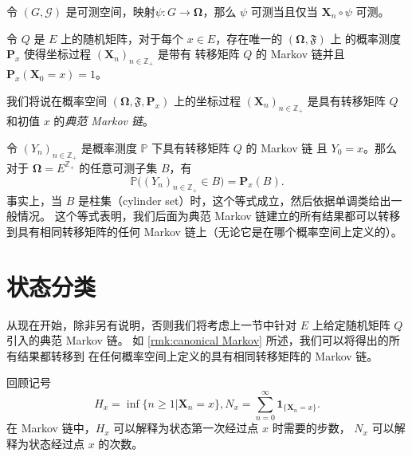\documentclass[fontset=none]{Notes}
\newcommand{\mat}[1]{\mathbold{#1}}
\newcommand{\matup}[1]{\mathbf{#1}}
\newcommand{\indicator}[1]{\mathbold 1_{#1}}
\begin{document}
\begin{lemma}
  令 $(G,\mathcal{G})$ 是可测空间，映射$\psi:G\to \mat\Omega$，那么
  $\psi$ 可测当且仅当 $\mat X_n\circ\psi$ 可测。
\end{lemma}

\begin{theorem}
  令 $Q$ 是 $E$ 上的随机矩阵，对于每个 $x\in E$，存在唯一的 $(\mat\Omega,\mathfrak F)$ 上
  的概率测度 $\matup P_x$ 使得坐标过程 $(\mat X_n)_{n\in \mathbb{Z}_+}$ 是带有
  转移矩阵 $Q$ 的 Markov 链并且 $\matup P_x(\mat X_0=x)=1$。
\end{theorem}
\begin{remark}
  我们将说在概率空间 $(\mat\Omega,\mathfrak F,\matup P_x)$ 上的坐标过程
  $(\mat X_n)_{n\in \mathbb{Z}_+}$ 是具有转移矩阵 $Q$ 和初值 $x$ 的\emph{典范 Markov 链}。
\end{remark}

\begin{remark}\label{rmk:canonical Markov}
  令 $(Y_n)_{n\in \mathbb{Z}_+}$ 是概率测度 $\mathbb{P}$ 下具有转移矩阵 $Q$ 的 Markov 链
  且 $Y_0=x$。那么对于 $\mat\Omega=E^{\mathbb{Z}_+}$ 的任意可测子集 $B$，有
  \[
    \mathbb{P}\bigl((Y_n)_{n\in \mathbb{Z}_+}\in B\bigr)=\matup P_x(B).
  \]
  事实上，当 $B$ 是柱集（cylinder set）时，这个等式成立，然后依据单调类给出一般情况。
  这个等式表明，我们后面为典范 Markov 链建立的所有结果都可以转移到具有相同转移矩阵的任何
  Markov 链上（无论它是在哪个概率空间上定义的）。
\end{remark}

\section{状态分类}

从现在开始，除非另有说明，否则我们将考虑上一节中针对 $E$ 上给定随机矩阵 $Q$ 引入的典范 Markov 链。
如 \autoref{rmk:canonical Markov} 所述，我们可以将得出的所有结果都转移到
在任何概率空间上定义的具有相同转移矩阵的 Markov 链。

回顾记号
\[
  H_x=\inf\{n\geq 1| \mat X_n=x\}, N_x=\sum_{n=0}^\infty \indicator{\{\mat X_n=x\}}.
\]
在 Markov 链中，$H_x$ 可以解释为状态第一次经过点 $x$ 时需要的步数，
$N_x$ 可以解释为状态经过点 $x$ 的次数。
\end{document}

